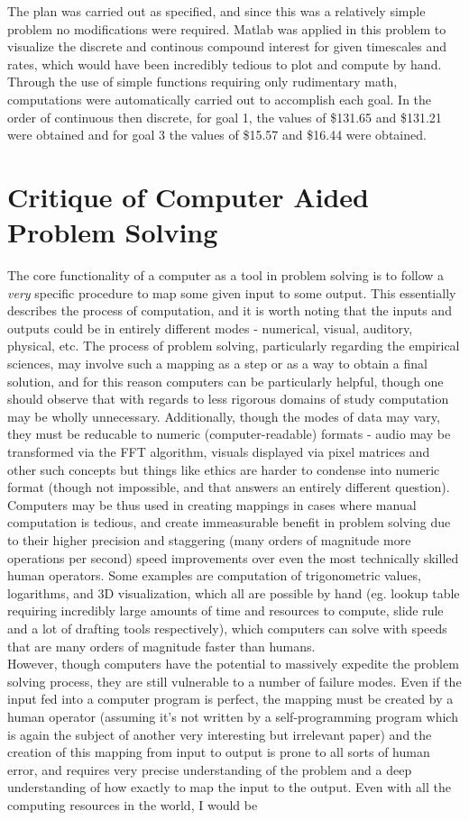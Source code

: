 \documentclass[10pt]{report}
\begin{document}
    The plan was carried out as specified, and since this was a relatively simple problem no modifications were required. Matlab was applied in this problem to visualize the discrete and continous compound interest for given timescales and rates, which would have been incredibly tedious to plot and compute by hand. Through the use of simple functions requiring only rudimentary math, computations were automatically carried out to accomplish each goal. In the order of continuous then discrete, for goal 1, the values of \$131.65 and \$131.21 were obtained and for goal 3 the values of \$15.57 and \$16.44 were obtained.
    \pagebreak
    \section*{Critique of Computer Aided Problem Solving}
    The core functionality of a computer as a tool in problem solving is to follow a \textit{very} specific procedure to map some given input to some output. This essentially describes the process of computation, and it is worth noting that the inputs and outputs could be in entirely different modes - numerical, visual, auditory, physical, etc. The process of problem solving, particularly regarding the empirical sciences, may involve such a mapping as a step or as a way to obtain a final solution, and for this reason computers can be particularly helpful, though one should observe that with regards to less rigorous domains of study computation may be wholly unnecessary. Additionally, though the modes of data may vary, they must be reducable to numeric (computer-readable) formats - audio may be transformed via the FFT algorithm, visuals displayed via pixel matrices and other such concepts but things like ethics are harder to condense into numeric format (though not impossible, and that answers an entirely different question). \\Computers may be thus used in creating mappings in cases where manual computation is tedious, and create immeasurable benefit in problem solving due to their higher precision and staggering (many orders of magnitude more operations per second) speed improvements over even the most technically skilled human operators. Some examples are computation of trigonometric values, logarithms, and 3D visualization, which all are possible by hand (eg. lookup table requiring incredibly large amounts of time and resources to compute, slide rule and a lot of drafting tools respectively), which computers can solve with speeds that are many orders of magnitude faster than humans.\\However, though computers have the potential to massively expedite the problem solving process, they are still vulnerable to a number of failure modes. Even if the input fed into a computer program is perfect, the mapping must be created by a human operator (assuming it's not written by a self-programming program which is again the subject of another very interesting but irrelevant paper) and the creation of this mapping from input to output is prone to all sorts of human error, and requires very precise understanding of the problem and a deep understanding of how exactly to map the input to the output. Even with all the computing resources in the world, I would be 
\end{document}
